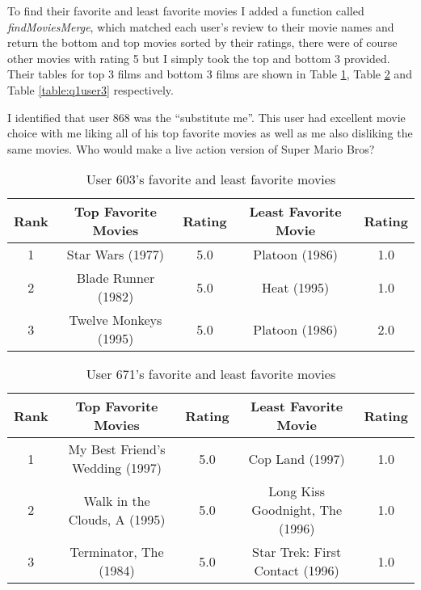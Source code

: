 \documentclass[letterpaper,11pt]{article}
\begin{document}
To find their favorite and least favorite movies I added a function called \textit{findMoviesMerge}, which matched each user's review to their movie names and return the bottom and top movies sorted by their ratings, there were of course other movies with rating 5 but I simply took the top and bottom 3 provided. Their tables for top 3 films and bottom 3 films are shown in Table \ref{table:q1user1}, Table \ref{table:q1user2} and Table \ref{table:q1user3} respectively.

I identified that user 868 was the ``substitute me''. This user had excellent movie choice with me liking all of his top favorite movies as well as me also disliking the same movies. Who would make a live action version of Super Mario Bros?

\begin{table}[htb]
\begin{tabular}{ | c | c | c | | c | c |}
\hline
\textbf{Rank} & \textbf{Top Favorite Movies} & \textbf{Rating} & \textbf{Least Favorite Movie} & \textbf{Rating} \\
\hline
1 & Star Wars (1977) & 5.0 & Platoon (1986) & 1.0 \\
\hline
2 & Blade Runner (1982) & 5.0 & Heat (1995) & 1.0 \\
\hline
3 & Twelve Monkeys (1995) & 5.0 & Platoon (1986) & 2.0 \\
\hline
\end{tabular}
\caption{User 603's favorite and least favorite movies}
\label{table:q1user1}
\end{table}

\begin{table}[htb]
\begin{tabular}{ | c | c | c | | c | c |}
\hline
\textbf{Rank} & \textbf{Top Favorite Movies} & \textbf{Rating} & \textbf{Least Favorite Movie} & \textbf{Rating} \\
\hline
1 & My Best Friend's Wedding (1997) & 5.0 & Cop Land (1997) & 1.0 \\
\hline
2 & Walk in the Clouds, A (1995) & 5.0 & Long Kiss Goodnight, The (1996) & 1.0 \\
\hline
3 & Terminator, The (1984) & 5.0 & Star Trek: First Contact (1996) & 1.0 \\
\hline
\end{tabular}
\caption{User 671's favorite and least favorite movies}
\label{table:q1user2}
\end{table}

\clearpage
\end{document}
